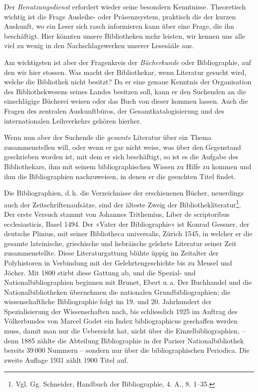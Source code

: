 \documentclass[a4paper,
fontsize=11pt,
oneside,
numbers=noperiodatend,
parskip=half-,
bibliography=totoc,
final
]{scrartcl}
\begin{document}
Der \emph{Benutzungsdienst} erfordert wieder seine besondern Kenntnisse.
Theoretisch wichtig ist die Frage Ausleihe- oder Präsenzsystem,
praktisch die der kurzen Auskunft, wo ein Leser sich rasch informieren
kann über eine Frage, die ihn beschäftigt. Hier könnten unsere
Bibliotheken mehr leisten, wir kennen uns alle viel zu wenig in den
Nachschlagewerken unserer Lesesääle aus.

Am wichtigsten ist aber der Fragenkreis der \emph{Bücherkunde} oder
Bibliographie, auf den wir hier stossen. Was macht der Bibliothekar,
wenn Literatur gesucht wird, welche die Bibliothek nicht besitzt? Da er
eine genaue Kenntnis der Organisation des Bibliothekwesens seines Landes
besitzen soll, kann er den Suchenden an die einschlägige Bücherei weisen
oder das Buch von dieser kommen lassen. Auch die Fragen des zentralen
Auskunftbüros, der Gesamtkatalogisierung und des internationalen
Leihverkehrs gehören hierher.

Wenn nun aber der Suchende die \emph{gesamte} Literatur über ein Thema
zusammenstellen will, oder wenn er gar nicht weiss, was über den
Gegenstand geschrieben worden ist, mit dem er sich beschäftigt, so ist
es die Aufgabe des Bibliothekars, ihm mit seinem bibliographischen
Wissen zu Hilfe zu kommen und ihm die Bibliographien nachzuweisen, in
denen er die gesuchten Titel findet.

Die Bibliographien, d.\,h. die Verzeichnisse der erschienenen Bücher,
neuerdings auch der Zeitschriftenaufsätze, sind der älteste Zweig der
Bibliothekliteratur\footnote{Vgl. Gg. Schneider, Handbuch der
  Bibliographie, 4. A., 8. 1--35.}. Der erste Versuch stammt von
Johannes Trithemius, Liber de scriptoribus ecclesiasticis, Basel 1494.
Der «Vater der Bibliographie» ist Konrad Gessner, der deutsche Plinius,
mit seiner Bibliotheca universalis, Zürich 1545, in welcher er die
gesamte lateinische, griechische und hebräische gelehrte Literatur
seiner Zeit zusammenstellte. Diese Literaturgattung blühte üppig im
Zeitalter der Polyhistoren in Verbindung mit der Gelehrtengeschichte bis
zu Meusel und Jöcher. Mit 1800 stirbt diese Gattung ab, und die Spezial-
und Nationalbibliographien beginnen mit Brunet, Ebert u.\,a. Der
Buchhandel und die Nationalbibliotheken übernehmen die nationalen
Grundbibliographien; die wissenschaftliche Bibliographie folgt im 19.
und 20. Jahrhundert der Spezialisierung der Wissenschaften nach, bis
schliesslich 1925 im Auftrag des Völkerbundes von Marcel Godet ein Index
bibliographicus geschaffen werden muss, damit man nur die Uebersicht
hat, nicht über die Einzelbibliographien, -- denn 1885 zählte die
Abteilung Bibliographie in der Pariser Nationalbibliothek bereits 39\,000
Nummern -- sondern nur über die bibliographischen Periodica. Die zweite
Auflage 1931 zählt 1900 Titel auf.
\end{document}
